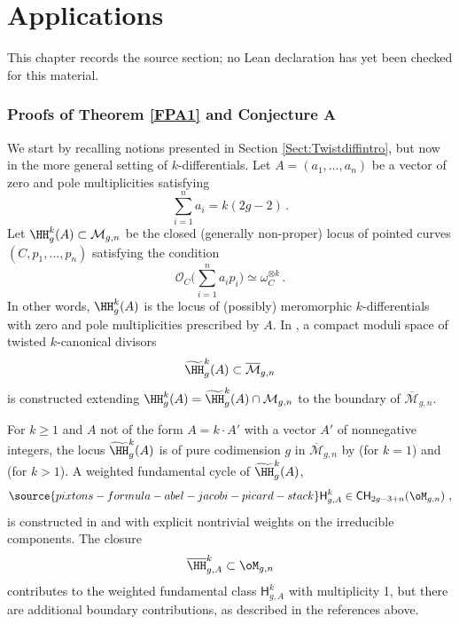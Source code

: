 \chapter{Applications}
\label{pixtons-formula-abel-jacobi-picard-stack-chapter-09}

\begin{remark}
\label{pixtons-formula-abel-jacobi-picard-stack-chapter-09-source}
This chapter records the source section; no Lean declaration has yet been checked for this material.
\notready
\end{remark}

\label{sec:applications}
\subsection{Proofs of Theorem \ref{FPA1} and Conjecture A} \label{Sect:ProofConjA}
We start by recalling notions presented in Section \ref{Sect:Twistdiffintro}, but now in the more general setting of $k$-differentials.
Let $A=(a_1,\ldots,a_n)$ be a vector of zero and pole multiplicities
satisfying
$$\sum_{i=1}^n a_i= k(2g-2)\, .$$
Let $\HH^k_g(A) \subset \mathcal{M}_{g,n}$ be the closed (generally non-proper) locus
of pointed curves $(C,p_1,\ldots,p_n)$ satisfying the condition
$$\mathcal{O}_C\Big(\sum_{i=1}^n a_i p_i\Big) \simeq \omega_C^{\otimes k}\, .$$
In other words, $\HH^k_g(A)$ is the locus of (possibly) meromorphic $k$-differentials
with zero and pole multiplicities prescribed by $A$.
In \cite{Farkas2016The-moduli-spac}, a compact moduli space of twisted $k$-canonical divisors
$$\widetilde{\HH}^k_g(A) \subset \overline{\mathcal{M}}_{g,n}$$
is constructed extending $\HH^k_g(A) = \widetilde{\HH}^k_g(A) \cap \mathcal{M}_{g,n} $ to the boundary of $\overline{\mathcal{M}}_{g,n}$.

For $k \geq 1$ and $A$ not of the form $A = k \cdot A'$ with a vector $A'$ of nonnegative integers, the locus
$\widetilde{\HH}^k_g(A)$ is of pure codimension $g$ in
$\overline{\mathcal{M}}_{g,n}$ by \cite[Theorem 3]{Farkas2016The-moduli-spac} (for $k=1$) and \cite[Theorem 1.1]{Schmitt2016Dimension-theor} (for $k>1$).
A weighted fundamental cycle of $\widetilde{\HH}^k_g(A)$,
\begin{equation}\label{wwww4k}
\source{pixtons-formula-abel-jacobi-picard-stack}
\mathsf{H}^k_{g,A}\in \mathsf{CH}_{2g-3+n}(\oM_{g,n})\ ,
\end{equation}
is constructed in
\cite[Appendix A]{Farkas2016The-moduli-spac} and \cite[Section 3.1]{Schmitt2016Dimension-theor} with explicit nontrivial
weights on the irreducible components.
The closure
$$\overline{\HH}^k_{g,A}\subset \oM_{g,n}$$
contributes to the weighted fundamental class $\mathsf{H}^k_{g,A}$ with
multiplicity 1, but there are additional boundary contributions, as described in the references above.

